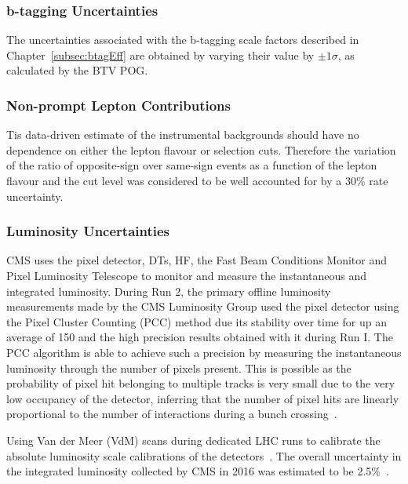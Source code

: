 \subsubsection{b-tagging Uncertainties}
The uncertainties associated with the b-tagging scale factors described in Chapter~\ref{subsec:btagEff} are obtained by varying their value by $\pm 1\sigma$, as calculated by the BTV POG.

\subsubsection{Non-prompt Lepton Contributions}
Tis data-driven estimate of the instrumental backgrounds should have no dependence on either the lepton flavour or selection cuts.
Therefore the variation of the ratio of opposite-sign over same-sign events as a function of the lepton flavour and the cut level was considered to be well accounted for by a 30\% rate uncertainty.

\subsubsection{Luminosity Uncertainties}
CMS uses the pixel detector, DTs, HF, the Fast Beam Conditions Monitor and Pixel Luminosity Telescope to monitor and measure the instantaneous and integrated luminosity.
During Run 2, the primary offline luminosity measurements made by the CMS Luminosity Group used the pixel detector using the Pixel Cluster Counting (PCC) method due its stability over time for up an average \PU of 150 and the high precision results obtained with it during Run I.
The PCC algorithm is able to achieve such a precision by measuring the instantaneous luminosity through the number of pixels present. 
This is possible as the probability of pixel hit belonging to multiple tracks is very small due to the very low occupancy of the detector, inferring that the number of pixel hits are linearly proportional to the number of interactions during a bunch crossing~\cite{CMS:2017_lumi}.

Using Van der Meer (VdM) scans during dedicated LHC runs to calibrate the absolute luminosity scale calibrations of the detectors~\cite{vanderMeer:1968zz}.
The overall uncertainty in the integrated luminosity collected by CMS in 2016 was estimated to be 2.5\%~\cite{CMS:2017_lumi}.


